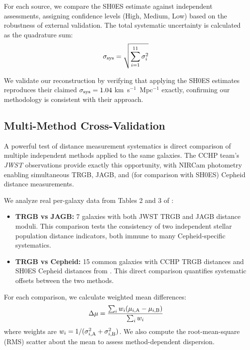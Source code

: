 \documentclass[twocolumn, linenumbers]{aastex701}
\begin{document}
For each source, we compare the SH0ES estimate against independent assessments, assigning confidence levels (High, Medium, Low) based on the robustness of external validation. The total systematic uncertainty is calculated as the quadrature sum:
\begin{equation}
\sigma_{\rm sys} = \sqrt{\sum_{i=1}^{11} \sigma_i^2}
\end{equation}

We validate our reconstruction by verifying that applying the SH0ES estimates reproduces their claimed $\sigma_{\rm sys} = 1.04$ km~s$^{-1}$~Mpc$^{-1}$ exactly, confirming our methodology is consistent with their approach.

\subsection{Multi-Method Cross-Validation} \label{sec:methods_crossval}

A powerful test of distance measurement systematics is direct comparison of multiple independent methods applied to the same galaxies. The CCHP team's \textit{JWST} observations \citep{Freedman2024} provide exactly this opportunity, with NIRCam photometry enabling simultaneous TRGB, JAGB, and (for comparison with SH0ES) Cepheid distance measurements.

We analyze real per-galaxy data from Tables 2 and 3 of \citet{Freedman2024}:

\begin{itemize}
\item \textbf{TRGB vs JAGB:} 7 galaxies with both JWST TRGB and JAGB distance moduli. This comparison tests the consistency of two independent stellar population distance indicators, both immune to many Cepheid-specific systematics.

\item \textbf{TRGB vs Cepheid:} 15 common galaxies with CCHP TRGB distances and SH0ES Cepheid distances from \citet{Riess2022}. This direct comparison quantifies systematic offsets between the two methods.
\end{itemize}

For each comparison, we calculate weighted mean differences:
\begin{equation}
\Delta\mu = \frac{\sum_i w_i (\mu_{i,\rm A} - \mu_{i,\rm B})}{\sum_i w_i}
\end{equation}
where weights are $w_i = 1/(\sigma_{i,\rm A}^2 + \sigma_{i,\rm B}^2)$. We also compute the root-mean-square (RMS) scatter about the mean to assess method-dependent dispersion.
\end{document}
